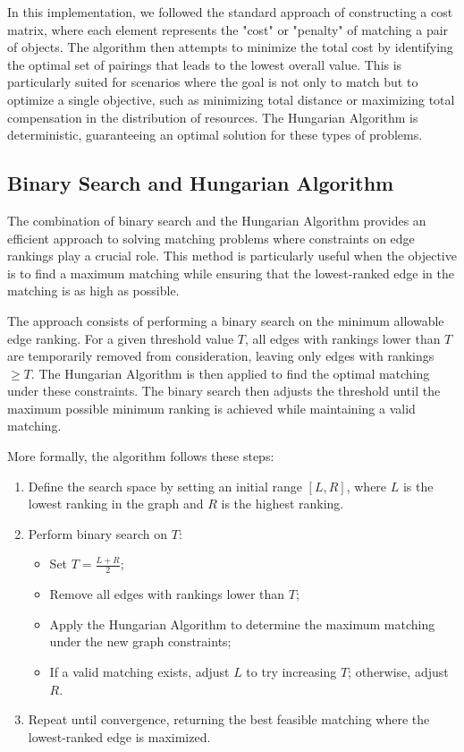     In this implementation, we followed the standard approach of constructing a cost matrix, where each element represents the "cost" or "penalty" of matching a pair of objects. The algorithm then attempts to minimize the total cost by identifying the optimal set of pairings that leads to the lowest overall value. This is particularly suited for scenarios where the goal is not only to match but to optimize a single objective, such as minimizing total distance or maximizing total compensation in the distribution of resources. The Hungarian Algorithm is deterministic, guaranteeing an optimal solution for these types of problems.

    \subsection{Binary Search and Hungarian Algorithm}

        The combination of binary search and the Hungarian Algorithm provides an efficient approach to solving matching problems where constraints on edge rankings play a crucial role. This method is particularly useful when the objective is to find a maximum matching while ensuring that the lowest-ranked edge in the matching is as high as possible.
        
        The approach consists of performing a binary search on the minimum allowable edge ranking. For a given threshold value \( T \), all edges with rankings lower than \( T \) are temporarily removed from consideration, leaving only edges with rankings \(\geq T\). The Hungarian Algorithm is then applied to find the optimal matching under these constraints. The binary search then adjusts the threshold until the maximum possible minimum ranking is achieved while maintaining a valid matching.
        
        More formally, the algorithm follows these steps:
        
        \begin{enumerate}
            \item Define the search space by setting an initial range \([L, R]\), where \( L \) is the lowest ranking in the graph and \( R \) is the highest ranking.
            \item Perform binary search on \( T \):
            \begin{itemize}
                \item Set \( T = \frac{L + R}{2} \);
                \item Remove all edges with rankings lower than \( T \);
                \item Apply the Hungarian Algorithm to determine the maximum matching under the new graph constraints;
                \item If a valid matching exists, adjust \( L \) to try increasing \( T \); otherwise, adjust \( R \).
            \end{itemize}
            \item Repeat until convergence, returning the best feasible matching where the lowest-ranked edge is maximized.
        \end{enumerate}
        
